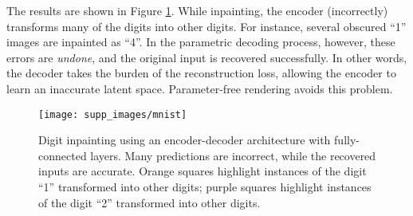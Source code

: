 \documentclass[10pt,twocolumn,letterpaper]{article}
\begin{document}
The results are shown in Figure \ref{fig:mnist}.
While inpainting, the encoder (incorrectly) transforms many of the digits into other digits. For instance, several obscured ``1'' images are inpainted as ``4''. In the parametric decoding process, however, these errors are \textit{undone}, and the original input is recovered successfully. In other words, the decoder takes the burden of the reconstruction loss, allowing the encoder to learn an inaccurate latent space. Parameter-free rendering avoids this problem.


\begin{figure}[t]
    \centering
    \texttt{[image: supp\_images/mnist]}
     \centering
    \caption{Digit inpainting using an encoder-decoder architecture with fully-connected layers. Many predictions are incorrect, while the recovered inputs are accurate. Orange squares highlight instances of the digit ``1'' transformed into other digits; purple squares highlight instances of the digit ``2'' transformed into other digits.}
    \label{fig:mnist}
\end{figure}

\end{document}

